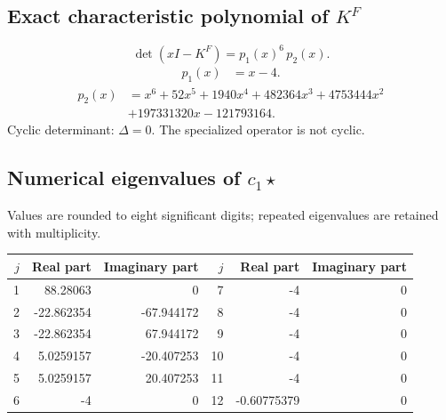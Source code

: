 \documentclass[10pt,a4paper]{article}
\begin{document}
\subsection*{Exact characteristic polynomial of $K^F$}
\[\det(xI-K^F)=p_{1}(x)^{6}\,p_{2}(x).\]
\[\begin{aligned}p_{1}(x)&=x - 4.\end{aligned}\]
\[\begin{aligned}p_{2}(x)&=x^{6} + 52 x^{5} + 1940 x^{4} + 482364 x^{3} + 4753444 x^{2}\\&+197331320 x - 121793164.\end{aligned}\]
Cyclic determinant: $\Delta=0$. The specialized operator is not cyclic.
\subsection*{Numerical eigenvalues of $c_1\star$}
Values are rounded to eight significant digits; repeated eigenvalues are retained with multiplicity.
\begin{center}\small\begin{tabular}{rrr@{\qquad}rrr}\toprule $j$ & Real part & Imaginary part & $j$ & Real part & Imaginary part\\\midrule
1 & 88.28063 & 0 & 7 & -4 & 0\\
2 & -22.862354 & -67.944172 & 8 & -4 & 0\\
3 & -22.862354 & 67.944172 & 9 & -4 & 0\\
4 & 5.0259157 & -20.407253 & 10 & -4 & 0\\
5 & 5.0259157 & 20.407253 & 11 & -4 & 0\\
6 & -4 & 0 & 12 & -0.60775379 & 0\\
\bottomrule\end{tabular}\end{center}
\end{document}
